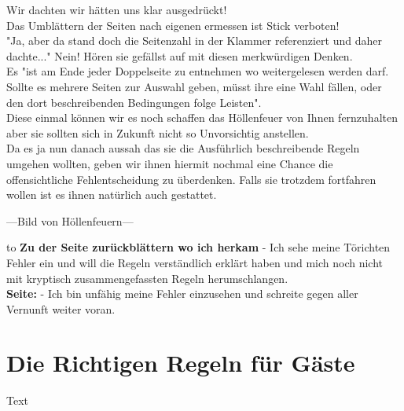 \documentclass[11pt,a5paper,twoside,openright]{book}
\begin{document}
Wir dachten wir hätten uns klar ausgedrückt!\\
Das Umblättern der Seiten nach eigenen ermessen ist Stick verboten!\\
"Ja, aber da stand doch die Seitenzahl in der Klammer referenziert und daher dachte..." Nein! Hören sie gefällst auf mit diesen merkwürdigen Denken.\\
Es "ist am Ende jeder Doppelseite zu entnehmen wo weitergelesen werden darf. Sollte es mehrere Seiten zur Auswahl geben, müsst ihre eine Wahl fällen, oder den dort beschreibenden Bedingungen folge Leisten".\\
Diese einmal können wir es noch schaffen das Höllenfeuer von Ihnen fernzuhalten aber sie sollten sich in Zukunft nicht so Unvorsichtig anstellen.\\

Da es ja nun danach aussah das sie die Ausführlich beschreibende Regeln umgehen wollten, geben wir ihnen hiermit nochmal eine Chance die offensichtliche Fehlentscheidung zu überdenken. Falls sie trotzdem fortfahren wollen ist es ihnen natürlich auch gestattet.

\newpage

---Bild von Höllenfeuern---

\vfill


\def\dashfill{\cleaders\hbox{-}\hfill}
\hbox to \hsize{\dashfill\hfil}
\textbf{Zu der Seite zurückblättern wo ich herkam} - Ich sehe meine Törichten Fehler ein und will die Regeln verständlich erklärt haben und mich noch nicht mit kryptisch zusammengefassten Regeln herumschlangen.\\
\textbf{Seite: \pageref{Zusammenfassung}} - Ich bin unfähig meine Fehler einzusehen und schreite gegen aller Vernunft weiter voran.


\newpage

\section*{Die Richtigen Regeln für Gäste}
\label{Zusammenfassung}

Text
\end{document}
